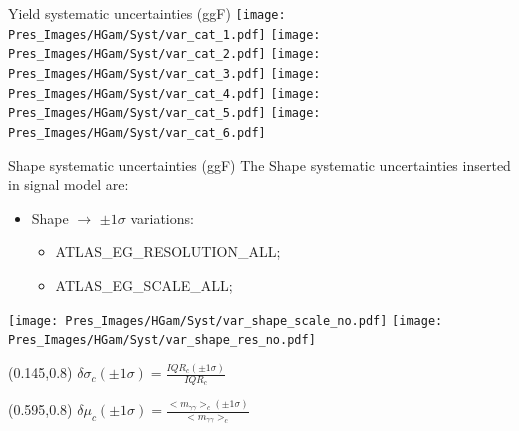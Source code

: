 \documentclass[10pt,UKenglish, leqno, xcolor = dvipsnames]{beamer}
\begin{document}
	\begin{frame}{Yield systematic uncertainties (ggF)}
		\vfill
		\centering
		\texttt{[image: Pres\_Images/HGam/Syst/var\_cat\_1.pdf]}
		\texttt{[image: Pres\_Images/HGam/Syst/var\_cat\_2.pdf]}
		\texttt{[image: Pres\_Images/HGam/Syst/var\_cat\_3.pdf]}
		\texttt{[image: Pres\_Images/HGam/Syst/var\_cat\_4.pdf]}
		\texttt{[image: Pres\_Images/HGam/Syst/var\_cat\_5.pdf]}
		\texttt{[image: Pres\_Images/HGam/Syst/var\_cat\_6.pdf]}
		\vfill
	\end{frame}
	
	\begin{frame}{Shape systematic uncertainties (ggF)}
		\vfill
		The Shape systematic uncertainties inserted in signal model are:
		\begin{itemize}
			\item Shape $\rightarrow$ $\pm1\sigma$ variations:
			\begin{itemize}
				\item ATLAS\_EG\_RESOLUTION\_ALL;
				\item ATLAS\_EG\_SCALE\_ALL;
			\end{itemize}
		\end{itemize}
		\begin{center}
			\texttt{[image: Pres\_Images/HGam/Syst/var\_shape\_scale\_no.pdf]}
			\texttt{[image: Pres\_Images/HGam/Syst/var\_shape\_res\_no.pdf]}
		\end{center}
		\vfill
		
		\begin{textblock}{}(0.145,0.8)
			\small
			$\delta\sigma_c(\pm1\sigma)=\frac{IQR_c(\pm1\sigma)}{IQR_c}$
		\end{textblock}
		
		\begin{textblock}{}(0.595,0.8)
			\small
			$\delta\mu_c(\pm1\sigma)=\frac{<m_{\gamma\gamma}>_c(\pm1\sigma)}{<m_{\gamma\gamma}>_c}$
		\end{textblock}
	\end{frame}
	
\end{document}
